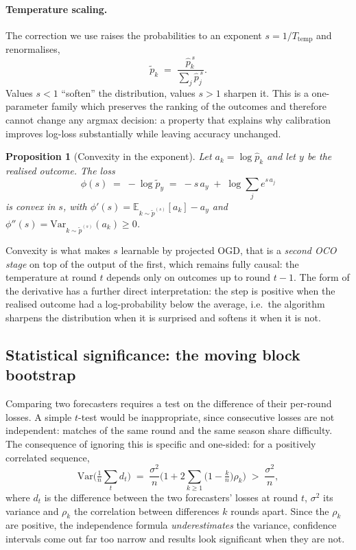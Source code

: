 \documentclass[12pt,a4paper,oneside]{report}
\renewcommand{\_}{\oldunderscore\allowbreak}
\theoremstyle{definition}
\theoremstyle{plain}
\newtheorem{proposition}[theorem]{Proposition}
\theoremstyle{definition}   %
\begin{document}
\paragraph{Temperature scaling.} The correction we use raises the probabilities to an exponent
$s = 1/T_{\text{temp}}$ and renormalises,
\[
\tilde{p}_k \;=\; \frac{\hat{p}_k^{\,s}}{\sum_{j} \hat{p}_j^{\,s}}.
\]
Values $s<1$ ``soften'' the distribution, values $s>1$ sharpen it. This is a one-parameter
family which preserves the ranking of the outcomes and therefore cannot change any argmax
decision: a property that explains why calibration improves log-loss substantially while
leaving accuracy unchanged.

\begin{proposition}[Convexity in the exponent]
\label{prop:temp-convex}
Let $a_k = \log \hat{p}_k$ and let $y$ be the realised outcome. The loss
\[
\phi(s) \;=\; -\log \tilde{p}_y \;=\; -s\,a_y \;+\; \log \sum_j e^{s\,a_j}
\]
is convex in $s$, with $\phi'(s) = \mathbb{E}_{k\sim \tilde{p}^{(s)}}[a_k] - a_y$ and
$\phi''(s) = \mathrm{Var}_{k\sim \tilde{p}^{(s)}}(a_k) \geq 0$.
\end{proposition}

Convexity is what makes $s$ learnable by projected OGD, that is a \emph{second OCO stage} on top
of the output of the first, which remains fully causal: the temperature at round $t$ depends only
on outcomes up to round $t-1$. The form of the derivative has a further direct interpretation:
the step is positive when the realised outcome had a log-probability below the average, i.e.\ the
algorithm sharpens the distribution when it is surprised and softens it when it is not.

\subsection{Statistical significance: the moving block bootstrap}
\label{sec:bootstrap-theory}

Comparing two forecasters requires a test on the difference of their per-round losses. A simple
$t$-test would be inappropriate, since consecutive losses are not independent: matches of the
same round and the same season share difficulty. The consequence of ignoring this is specific
and one-sided: for a positively correlated sequence,
\[
\mathrm{Var}\Big(\tfrac{1}{n}\sum_t d_t\Big) \;=\; \frac{\sigma^2}{n}
\Big( 1 + 2\sum_{k\geq 1} \big(1-\tfrac{k}{n}\big)\rho_k \Big) \;>\; \frac{\sigma^2}{n},
\]
where $d_t$ is the difference between the two forecasters' losses at round $t$, $\sigma^2$ its
variance and $\rho_k$ the correlation between differences $k$ rounds apart. Since the $\rho_k$ are
positive, the independence formula \emph{underestimates} the variance, confidence intervals come out far
too narrow and results look significant when they are not.
\end{document}
